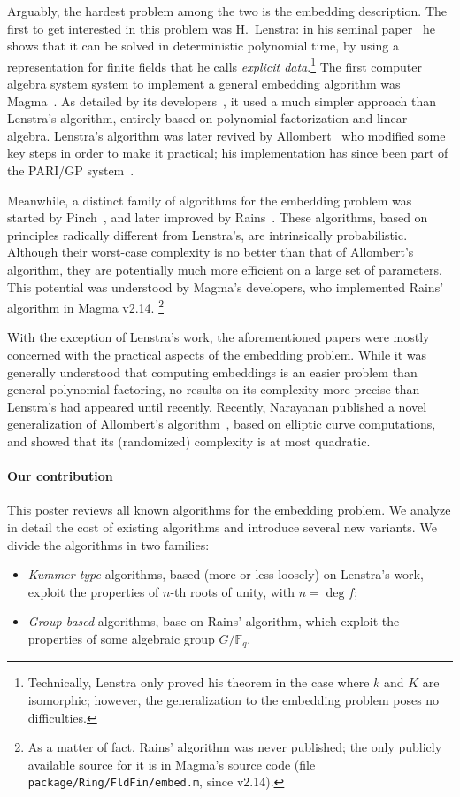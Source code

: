 \documentclass{article}
\def\F {\ensuremath{\mathbb{F}}}
\begin{document}
Arguably, the hardest problem among the two is the embedding
description. %
The first to get interested in this problem was H.~Lenstra: in his
seminal paper~\cite{LenstraJr91} he shows that it can be solved in
deterministic polynomial time, by using a representation for finite
fields that he calls \emph{explicit data}.\footnote{Technically,
  Lenstra only proved his theorem in the case where $k$ and $K$ are
  isomorphic; however, the generalization to the embedding problem
  poses no difficulties.} %
The first computer algebra system system to implement a general
embedding algorithm was Magma~\cite{MAGMA}. %
As detailed by its developers~\cite{bosma+cannon+steel97}, it used a
much simpler approach than Lenstra's algorithm, entirely based on
polynomial factorization and linear algebra. %
Lenstra's algorithm was later revived by
Allombert~\cite{Allombert02,Allombert02-rev} who modified some key
steps in order to make it practical; his implementation has since been
part of the PARI/GP system~\cite{Pari}.

Meanwhile, a distinct family of algorithms for the embedding problem
was started by Pinch~\cite{Pinch}, and later improved by
Rains~\cite{rains2008}. %
These algorithms, based on principles radically different from
Lenstra's, are intrinsically probabilistic. %
Although their worst-case complexity is no better than that of
Allombert's algorithm, they are potentially much more efficient on a
large set of parameters. %
This potential was understood by Magma's developers, who implemented
Rains' algorithm in Magma v2.14.%
\footnote{As a matter of fact, Rains' algorithm was never published;
  the only publicly available source for it is in Magma's source code
  (file \texttt{package/Ring/FldFin/embed.m}, since v2.14).}

With the exception of Lenstra's work, the aforementioned papers were
mostly concerned with the practical aspects of the embedding
problem. %
While it was generally understood that computing embeddings is an
easier problem than general polynomial factoring, no results on its
complexity more precise than Lenstra's had appeared until recently. %
Recently, Narayanan published a novel generalization of Allombert's
algorithm~\cite{narayanan2016fast}, based on elliptic curve
computations, and showed that its (randomized) complexity is at most
quadratic.

\paragraph{Our contribution}
This poster reviews all known algorithms for the embedding
problem. We analyze in detail the cost of existing algorithms and
introduce several new variants. %
We divide the algorithms in two families:
\begin{itemize}
\item \emph{Kummer-type} algorithms, based (more or less loosely) on
  Lenstra's work, exploit the properties of $n$-th roots of
  unity, with $n=\deg f$;
\item \emph{Group-based} algorithms, base on Rains' algorithm, which
  exploit the properties of some algebraic group $G/\F_q$.
\end{itemize}
\end{document}

